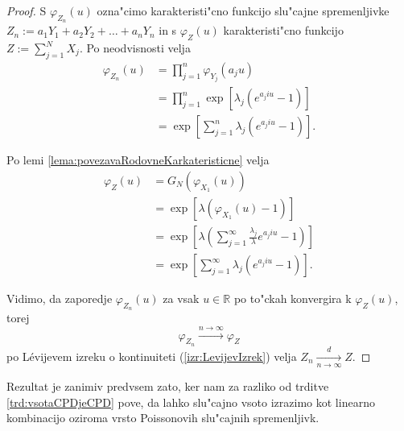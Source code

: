 \documentclass[12pt, a4paper, reqno]{amsart}
\theoremstyle{definition}
\theoremstyle{plain}
\newcommand{\R}{\mathbb{R}}
\newcommand{\1}{\mathds{1}}
\begin{document}
    \begin{proof}
        S $\varphi_{Z_n}(u)$ ozna"cimo karakteristi"cno funkcijo slu"cajne spremenljivke 
        $Z_n := a_1Y_1 + a_2Y_2 + \dots + a_nY_n$ in s $\varphi_{Z}(u)$ karakteristi"cno funkcijo
        $Z:= \sum_{j=1}^{N}X_j$. Po neodvisnosti velja
        \begin{align*}
            \varphi_{Z_n}(u) 
                    &= \prod_{j=1}^{n}\varphi_{Y_j}(a_ju)\\
                    &= \prod_{j=1}^{n}\exp\left[\lambda_j\left(e^{a_j i u} - 1\right)\right] \\
                    &= \exp\left[\sum_{j=1}^{n}\lambda_j\left(e^{a_j i u} - 1\right)\right].
        \end{align*}

        \noindent
        Po lemi \ref{lema:povezavaRodovneKarkateristicne} velja
        \begin{align*}
            \varphi_{Z}(u) 
                    &= G_N\left(\varphi_{X_1}(u)\right) \\
                    &= \exp\left[\lambda\left(\varphi_{X_1}(u) - 1\right)\right] \\
                    & = \exp\left[\lambda\left(\sum_{j=1}^\infty\frac{\lambda_j}{\lambda}e^{a_jiu} - 1\right)\right]\\
                    &= \exp\left[\sum_{j=1}^{\infty}\lambda_j\left(e^{a_j i u} - 1\right)\right].
        \end{align*}

        \noindent 
        Vidimo, da zaporedje $\varphi_{Z_n}(u)$ za vsak $u\in\R$ po to"ckah konvergira k $\varphi_{Z}(u)$, torej
        \begin{equation*}
            \varphi_{Z_n} \xrightarrow{n\to\infty}\varphi_Z
        \end{equation*}
        po Lévijevem izreku o kontinuiteti (\ref{izr:LevijevIzrek}) velja $Z_n \xrightarrow[n\to\infty]{d}Z$.
    \end{proof}

    Rezultat je zanimiv predvsem zato, ker nam za razliko od trditve \ref{trd:vsotaCPDjeCPD} pove, da 
    lahko slu"cajno vsoto izrazimo kot linearno kombinacijo oziroma vrsto Poissonovih slu"cajnih spremenljivk.
\end{document}
